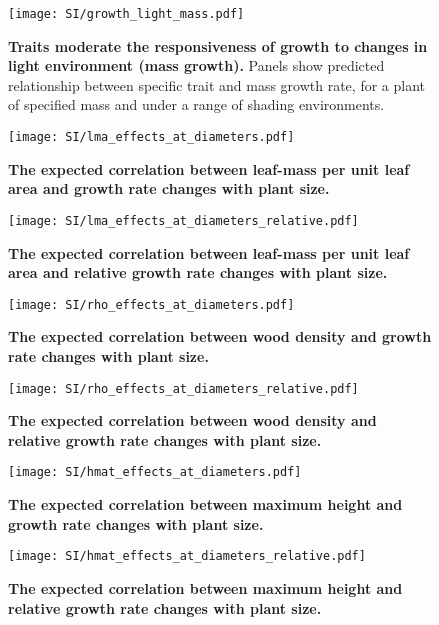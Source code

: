 \documentclass[10pt,twoside]{article}\usepackage[]{graphicx}\usepackage[]{color}
\begin{document}
\newpage

\begin{figure}[ht]
\centering
\texttt{[image: SI/growth\_light\_mass.pdf]}
\caption{\textbf{Traits moderate the responsiveness of growth to changes
in light environment (mass growth).} Panels show predicted relationship between
specific trait and mass growth rate, for a plant of specified
mass and under a range of shading environments.
\label{fig:growth_light_mass}}
\end{figure}

\newpage


\begin{figure}[ht]
\centering
\texttt{[image: SI/lma\_effects\_at\_diameters.pdf]}
\caption{\textbf{The expected correlation between leaf-mass per unit leaf area
and growth rate changes with plant size.} \label{f-lma_growth_size}}
\end{figure}

\begin{figure}[ht]
\centering
\texttt{[image: SI/lma\_effects\_at\_diameters\_relative.pdf]}
\caption{\textbf{The expected correlation between leaf-mass per unit leaf area
and relative growth rate changes with plant size.}
\label{f-lma_growth_size_relative}}
\end{figure}

\begin{figure}[ht]
\centering
\texttt{[image: SI/rho\_effects\_at\_diameters.pdf]}
\caption{\textbf{The expected correlation between wood density
and growth rate changes with plant size.} \label{f-rho_growth_size}}
\end{figure}

\begin{figure}[ht]
\centering
\texttt{[image: SI/rho\_effects\_at\_diameters\_relative.pdf]}
\caption{\textbf{The expected correlation between wood density
and relative growth rate changes with plant size.}
\label{f-rho_growth_size_relative}}
\end{figure}

\begin{figure}[ht]
\centering
\texttt{[image: SI/hmat\_effects\_at\_diameters.pdf]}
\caption{\textbf{The expected correlation between maximum height and
growth rate changes with plant size.} \label{f-hmat_growth_size}}
\end{figure}

\begin{figure}[ht]
\centering
\texttt{[image: SI/hmat\_effects\_at\_diameters\_relative.pdf]}
\caption{\textbf{The expected correlation between maximum height and
relative growth rate changes with plant size.}
\label{f-hmat_growth_size_relative}}
\end{figure}




\clearpage


\end{document}
